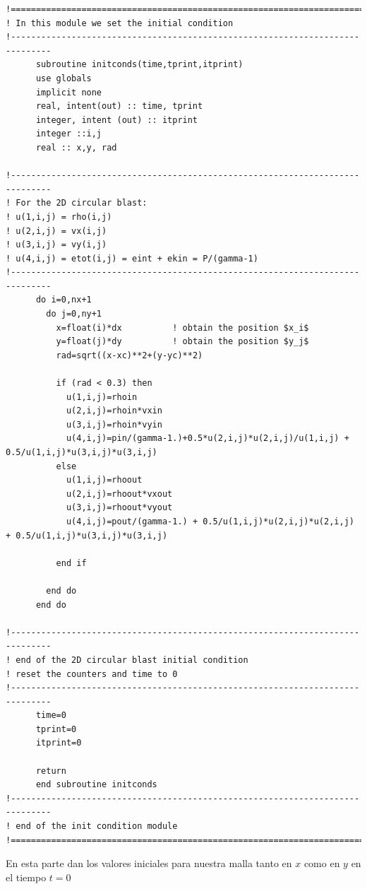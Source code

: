 \documentclass[12pt,a4paper]{book}
\begin{document}
\begin{lstlisting}[frame=single] 
!==============================================================================
! In this module we set the initial condition
!------------------------------------------------------------------------------
      subroutine initconds(time,tprint,itprint)
      use globals
      implicit none
      real, intent(out) :: time, tprint
      integer, intent (out) :: itprint
      integer ::i,j
      real :: x,y, rad

!------------------------------------------------------------------------------
! For the 2D circular blast:
! u(1,i,j) = rho(i,j)
! u(2,i,j) = vx(i,j)
! u(3,i,j) = vy(i,j)
! u(4,i,j) = etot(i,j) = eint + ekin = P/(gamma-1)
!------------------------------------------------------------------------------
      do i=0,nx+1
        do j=0,ny+1
          x=float(i)*dx          ! obtain the position $x_i$
          y=float(j)*dy          ! obtain the position $y_j$
          rad=sqrt((x-xc)**2+(y-yc)**2)

          if (rad < 0.3) then
            u(1,i,j)=rhoin
            u(2,i,j)=rhoin*vxin
            u(3,i,j)=rhoin*vyin
            u(4,i,j)=pin/(gamma-1.)+0.5*u(2,i,j)*u(2,i,j)/u(1,i,j) + 0.5/u(1,i,j)*u(3,i,j)*u(3,i,j)
          else
            u(1,i,j)=rhoout
            u(2,i,j)=rhoout*vxout
            u(3,i,j)=rhoout*vyout
            u(4,i,j)=pout/(gamma-1.) + 0.5/u(1,i,j)*u(2,i,j)*u(2,i,j) + 0.5/u(1,i,j)*u(3,i,j)*u(3,i,j)

          end if

        end do
      end do

!------------------------------------------------------------------------------
! end of the 2D circular blast initial condition
! reset the counters and time to 0
!------------------------------------------------------------------------------
      time=0
      tprint=0
      itprint=0

      return
      end subroutine initconds
!------------------------------------------------------------------------------
! end of the init condition module
!==============================================================================

\end{lstlisting}
En esta parte dan los valores iniciales para nuestra malla tanto en $x$ como en $y$ en el tiempo $t=0$
\end{document}
